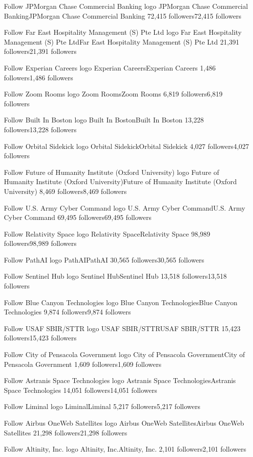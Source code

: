 Follow
JPMorgan Chase Commercial Banking logo
JPMorgan Chase Commercial BankingJPMorgan Chase Commercial Banking
72,415 followers72,415 followers

Follow
Far East Hospitality Management (S) Pte Ltd logo
Far East Hospitality Management (S) Pte LtdFar East Hospitality Management (S) Pte Ltd
21,391 followers21,391 followers

Follow
Experian Careers logo
Experian CareersExperian Careers
1,486 followers1,486 followers

Follow
Zoom Rooms logo
Zoom RoomsZoom Rooms
6,819 followers6,819 followers

Follow
Built In Boston logo
Built In BostonBuilt In Boston
13,228 followers13,228 followers

Follow
Orbital Sidekick logo
Orbital SidekickOrbital Sidekick
4,027 followers4,027 followers

Follow
Future of Humanity Institute (Oxford University) logo
Future of Humanity Institute (Oxford University)Future of Humanity Institute (Oxford University)
8,469 followers8,469 followers

Follow
U.S. Army Cyber Command logo
U.S. Army Cyber CommandU.S. Army Cyber Command
69,495 followers69,495 followers

Follow
Relativity Space logo
Relativity SpaceRelativity Space
98,989 followers98,989 followers

Follow
PathAI logo
PathAIPathAI
30,565 followers30,565 followers

Follow
Sentinel Hub logo
Sentinel HubSentinel Hub
13,518 followers13,518 followers

Follow
Blue Canyon Technologies logo
Blue Canyon TechnologiesBlue Canyon Technologies
9,874 followers9,874 followers

Follow
USAF SBIR/STTR logo
USAF SBIR/STTRUSAF SBIR/STTR
15,423 followers15,423 followers

Follow
City of Pensacola Government logo
City of Pensacola GovernmentCity of Pensacola Government
1,609 followers1,609 followers

Follow
Astranis Space Technologies logo
Astranis Space TechnologiesAstranis Space Technologies
14,051 followers14,051 followers

Follow
Liminal logo
LiminalLiminal
5,217 followers5,217 followers

Follow
Airbus OneWeb Satellites logo
Airbus OneWeb SatellitesAirbus OneWeb Satellites
21,298 followers21,298 followers

Follow
Altinity, Inc. logo
Altinity, Inc.Altinity, Inc.
2,101 followers2,101 followers

